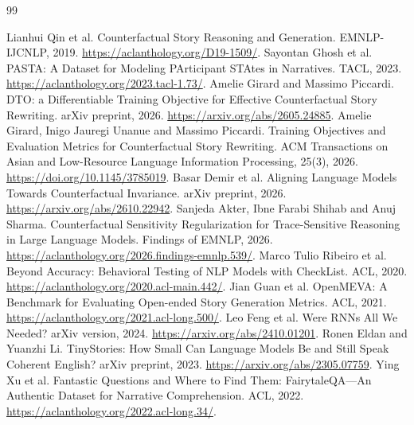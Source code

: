 \begin{thebibliography}{99}
\raggedright
{} Lianhui Qin et al. Counterfactual Story Reasoning and Generation. EMNLP-IJCNLP, 2019.
\url{https://aclanthology.org/D19-1509/}.
 Sayontan Ghosh et al. PASTA: A Dataset for Modeling PArticipant STAtes in Narratives. TACL, 2023.
\url{https://aclanthology.org/2023.tacl-1.73/}.
 Amelie Girard and Massimo Piccardi. DTO: a Differentiable Training Objective for Effective Counterfactual Story Rewriting. arXiv preprint, 2026.
\url{https://arxiv.org/abs/2605.24885}.
 Amelie Girard, Inigo Jauregi Unanue and Massimo Piccardi. Training Objectives and Evaluation Metrics for Counterfactual Story Rewriting. ACM Transactions on Asian and Low-Resource Language Information Processing, 25(3), 2026.
\url{https://doi.org/10.1145/3785019}.
 Basar Demir et al. Aligning Language Models Towards Counterfactual Invariance. arXiv preprint, 2026.
\url{https://arxiv.org/abs/2610.22942}.
 Sanjeda Akter, Ibne Farabi Shihab and Anuj Sharma. Counterfactual Sensitivity Regularization for Trace-Sensitive Reasoning in Large Language Models. Findings of EMNLP, 2026.
\url{https://aclanthology.org/2026.findings-emnlp.539/}.
 Marco Tulio Ribeiro et al. Beyond Accuracy: Behavioral Testing of NLP Models with CheckList. ACL, 2020.
\url{https://aclanthology.org/2020.acl-main.442/}.
 Jian Guan et al. OpenMEVA: A Benchmark for Evaluating Open-ended Story Generation Metrics. ACL, 2021.
\url{https://aclanthology.org/2021.acl-long.500/}.
 Leo Feng et al. Were RNNs All We Needed? arXiv version, 2024.
\url{https://arxiv.org/abs/2410.01201}.
 Ronen Eldan and Yuanzhi Li. TinyStories: How Small Can Language Models Be and Still Speak Coherent English? arXiv preprint, 2023.
\url{https://arxiv.org/abs/2305.07759}.
 Ying Xu et al. Fantastic Questions and Where to Find Them: FairytaleQA---An Authentic Dataset for Narrative Comprehension. ACL, 2022.
\url{https://aclanthology.org/2022.acl-long.34/}.
\end{thebibliography}
